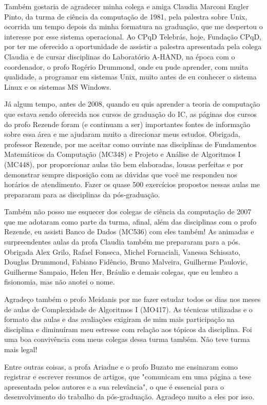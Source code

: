 Também gostaria de agradecer minha colega e amiga Claudia Marconi Engler Pinto, da turma de ciência da computação de 1981, pela palestra sobre Unix, ocorrida um tempo depois da minha formatura na graduação, que me despertou o interesse por esse sistema operacional. Ao CPqD Telebrás, hoje, Fundação CPqD, por ter me oferecido a oportunidade de assistir a palestra apresentada pela colega Claudia e de cursar disciplinas do Laboratório A-HAND, na época com o coordenador, o profo Rogério Drummond, onde eu pude aprender, com muita qualidade, a programar em sistemas Unix, muito antes de eu conhecer o sistema Linux e os sistemas MS Windows.

Já algum tempo, antes de 2008, quando eu quis aprender a teoria de computação que estava sendo oferecida nos cursos de graduação do IC, as páginas dos cursos do profo Rezende foram (e continuam a ser) importantes fontes de informação sobre essa área e me ajudaram muito a direcionar meus estudos. Obrigada, professor Rezende, por me aceitar como ouvinte nas disciplinas de Fundamentos Matemáticos da Computação (MC348) e Projeto e Análise de Algoritmos I (MC448), por proporcionar aulas tão bem elaboradas, lousas perfeitas e por demonstrar sempre disposição com as dúvidas que você me respondeu nos horários de atendimento. Fazer os quase 500 exercícios propostos nessas aulas me prepararam para as disciplinas da pós-graduação.

Também não posso me esquecer dos colegas de ciência da computação de 2007 que me adotaram como parte da turma, afinal, além das disciplinas com o profo Rezende, eu assisti Banco de Dados (MC536) com eles também! As animadas e surpreendentes aulas da profa Claudia também me prepararam para a pós. Obrigada Alex Grilo, Rafael Fonseca, Michel Fornaciali, Vanessa Schissato, Douglas Drummond, Fabiano Fidêncio, Bruno Malveira, Guilherme Paulovic, Guilherme Sampaio, Helen Her, Bráulio e demais colegas, que eu lembro a fisionomia, mas não anotei o nome.

Agradeço também o profo Meidanis por me fazer estudar todos os dias nos meses de aulas de Complexidade de Algoritmos I (MO417). As técnicas utilizadas e o formato das aulas e das avaliações exigiram de mim mais participação na disciplina e diminuíram meu estresse com relação aos tópicos da disciplina. Foi uma boa convivência com meus colegas dessa turma também. Não teve turma mais legal!

Entre outras coisas, a profa Ariadne e o profo Buzato me ensinaram como registrar e escrever resumos de artigos, que "comunicam em uma página a tese apresentada pelos autores e a sua relevância", o que é essencial para o desenvolvimento do trabalho da pós-graduação. Agradeço muito a eles por isso.

